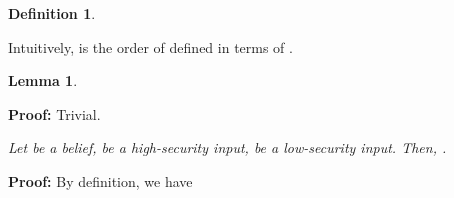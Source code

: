 \documentclass{llncs}
\newtheorem{definition}[theorem]{Definition}
\newtheorem{lemma}[theorem]{Lemma}
\newenvironment{proof}{\noindent\rm{\bf Proof:}}{\hbox{}\vspace*{0.2\baselineskip}}
\newenvironment{reflemma}[1]{\begin{trivlist}\item[\hskip
      \labelsep{\bf Lemma #1.}]\it}{\end{trivlist}}
\begin{document}
\begin{definition}

\end{definition}
Intuitively,  is the order of  defined in terms of
.

\begin{lemma}

\end{lemma}
\begin{proof}
Trivial.
\end{proof}

\begin{reflemma}{\ref{lem:be}}
  Let  be a belief,  be a high-security input,
   be a low-security input.  Then, .
\end{reflemma}
\begin{proof}
By definition, we have


\end{proof}
\end{document}
